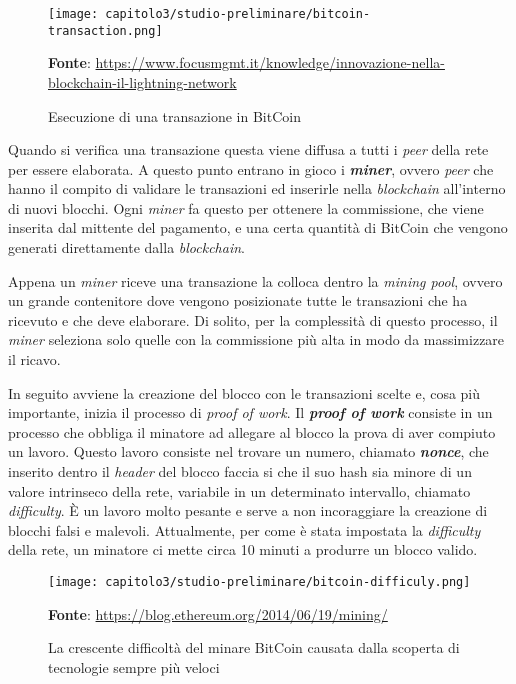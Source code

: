 \begin{figure}[h!]
  \centering
  \texttt{[image: capitolo3/studio-preliminare/bitcoin-transaction.png]}
  \caption{Esecuzione di una transazione in BitCoin}
  \textbf{Fonte}: \href{https://www.focusmgmt.it/knowledge/innovazione-nella-blockchain-il-lightning-network/}{https://www.focusmgmt.it/knowledge/innovazione-nella-blockchain-il-lightning-network}
\end{figure}

Quando si verifica una transazione questa viene diffusa a tutti i \textit{peer} della rete per essere elaborata. A questo punto entrano in gioco i \textit{\textbf{miner}}, ovvero \textit{peer} che hanno il compito di validare le transazioni ed inserirle nella \textit{blockchain} all'interno di nuovi blocchi. Ogni \textit{miner} fa questo per ottenere la commissione, che viene inserita dal mittente del pagamento, e una certa quantità di BitCoin che vengono generati direttamente dalla \textit{blockchain}.

Appena un \textit{miner} riceve una transazione la colloca dentro la \textit{mining pool}, ovvero un grande contenitore dove vengono posizionate tutte le transazioni che ha ricevuto e che deve elaborare. Di solito, per la complessità di questo processo, il \textit{miner} seleziona solo quelle con la commissione più alta in modo da massimizzare il ricavo.

In seguito avviene la creazione del blocco con le transazioni scelte e, cosa più importante, inizia  il processo di \textit{proof of work}. Il \textbf{\textit{proof of work}} consiste in un processo che obbliga il minatore ad allegare al blocco la prova di aver compiuto un lavoro. Questo lavoro consiste nel trovare un numero, chiamato \textit{\textbf{nonce}}, che inserito dentro il \textit{header} del blocco faccia si che il suo hash sia minore di un valore intrinseco della rete, variabile in un determinato intervallo, chiamato \textit{difficulty}. È un lavoro molto pesante e serve a non incoraggiare la creazione di blocchi falsi e malevoli. Attualmente, per come è stata impostata la \textit{difficulty} della rete, un minatore ci mette circa 10 minuti a produrre un blocco valido.

\begin{figure}[h!]
  \centering
  \texttt{[image: capitolo3/studio-preliminare/bitcoin-difficuly.png]}
  \caption{La crescente difficoltà del minare BitCoin causata dalla scoperta di tecnologie sempre più veloci}
  \textbf{Fonte}: \href{https://blog.ethereum.org/2014/06/19/mining/}{https://blog.ethereum.org/2014/06/19/mining/}
\end{figure}

